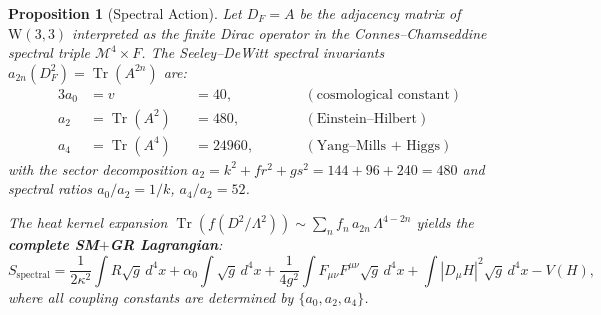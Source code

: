 \documentclass[12pt,a4paper]{article}
\newtheorem{proposition}[theorem]{Proposition}
\newcommand{\W}{\mathrm{W}(3,3)}
\begin{document}

\begin{proposition}[Spectral Action]\label{prop:spectral-action}
Let $D_F = A$ be the adjacency matrix of $\W$ interpreted as the
finite Dirac operator in the Connes--Chamseddine spectral triple
$\mathcal{M}^4 \times F$.  The Seeley--DeWitt spectral invariants
$a_{2n}(D_F^2) = \operatorname{Tr}(A^{2n})$ are:
\begin{alignat*}{3}
  a_0 &= v &&= 40,                     &\qquad& (\text{cosmological constant})\\
  a_2 &= \operatorname{Tr}(A^2) &&= 480,  && (\text{Einstein--Hilbert})\\
  a_4 &= \operatorname{Tr}(A^4) &&= 24960, && (\text{Yang--Mills + Higgs})
\end{alignat*}
with the sector decomposition
$a_2 = k^2 + f r^2 + g s^2 = 144 + 96 + 240 = 480$
and spectral ratios $a_0/a_2 = 1/k$, $a_4/a_2 = 52$.

The heat kernel expansion
$\operatorname{Tr}(f(D^2/\Lambda^2)) \sim \sum_n f_n\, a_{2n}\,\Lambda^{4-2n}$
yields the \textbf{complete SM$+$GR Lagrangian}:
\begin{equation}\label{eq:spectral-action}
  S_{\mathrm{spectral}}
    = \frac{1}{2\kappa^2}\!\int\!R\sqrt{g}\,d^4x
    + \alpha_0\!\int\!\sqrt{g}\,d^4x
    + \frac{1}{4g^2}\!\int\!F_{\mu\nu}F^{\mu\nu}\sqrt{g}\,d^4x
    + \!\int\!|D_\mu H|^2\sqrt{g}\,d^4x
    - V(H),
\end{equation}
where all coupling constants are determined by $\{a_0, a_2, a_4\}$.
\end{proposition}
\end{document}
